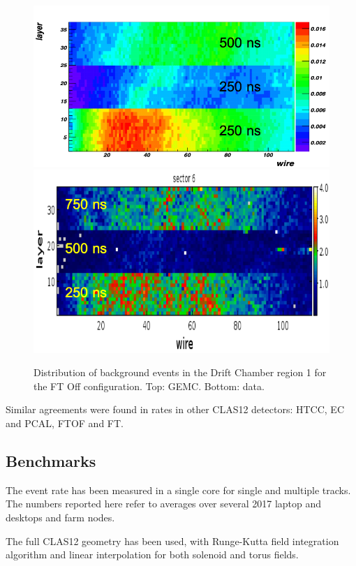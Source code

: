 \begin{figure}
	\centering
	\includegraphics[width=0.99\columnwidth,keepaspectratio]{img/ftOffGemcDCRates.png}
	\includegraphics[width=0.99\columnwidth,keepaspectratio]{img/ftOffDataDCRates.png}
	\caption{Distribution of background events in the Drift Chamber region 1 for the FT Off configuration.
             Top: GEMC. Bottom: data.}
	\label{fig:ftOffComparison}
\end{figure}

Similar agreements were found in rates in other CLAS12 detectors: HTCC, EC and PCAL, FTOF and FT.

\subsection{Benchmarks}

The event rate has been measured in a single core for single and multiple tracks. The numbers reported here
refer to averages over several 2017 laptop and desktops and farm nodes.

The full CLAS12 geometry has been used, with Runge-Kutta field integration algorithm
and linear interpolation for both solenoid and torus fields.

